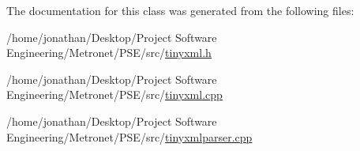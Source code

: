 The documentation for this class was generated from the following files\+:\begin{DoxyCompactItemize}
\item 
/home/jonathan/\+Desktop/\+Project Software Engineering/\+Metronet/\+P\+S\+E/src/\hyperlink{tinyxml_8h}{tinyxml.\+h}\item 
/home/jonathan/\+Desktop/\+Project Software Engineering/\+Metronet/\+P\+S\+E/src/\hyperlink{tinyxml_8cpp}{tinyxml.\+cpp}\item 
/home/jonathan/\+Desktop/\+Project Software Engineering/\+Metronet/\+P\+S\+E/src/\hyperlink{tinyxmlparser_8cpp}{tinyxmlparser.\+cpp}\end{DoxyCompactItemize}
